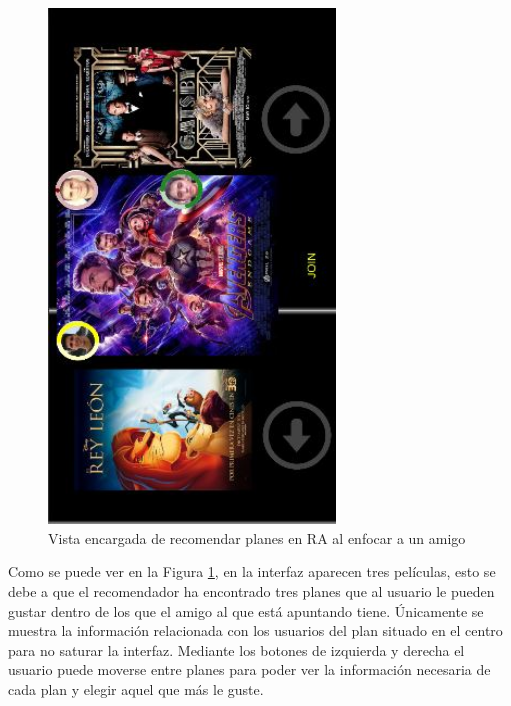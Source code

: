 \begin{figure}[H]
        \centering
        \includegraphics[width=3in, angle=270]{figures/chapter-3/CapturaRecomendador.JPG}
        \caption{Vista encargada de recomendar planes en RA al enfocar a un amigo}
        \label{fig:ra_recomendacion}
\end{figure}

Como se puede ver en la Figura \ref{fig:ra_recomendacion}, en la interfaz aparecen tres películas, esto se debe a que el recomendador ha encontrado tres planes que al usuario le pueden gustar dentro de los que el amigo al que está apuntando tiene. Únicamente se muestra la 
información relacionada con los usuarios del plan situado en el centro para no saturar la interfaz. Mediante los 
botones de izquierda y derecha el usuario puede moverse entre planes para poder ver la información necesaria 
de cada plan y elegir aquel que más le guste.


